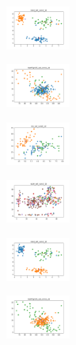 \begin{figure}[H]
\begin{subfigure}
        \centering
        \includegraphics[width=0.234\textwidth]{img/bl/rand_set_const_10_277451237_clust.png}
    \end{subfigure}
    \hfill
    \begin{subfigure}
        \centering
        \includegraphics[width=0.234\textwidth]{img/bl/newthyroid_set_const_10_277451237_clust.png}
    \end{subfigure}
    \hfill
    \begin{subfigure}
        \centering
        \includegraphics[width=0.234\textwidth]{img/bl/iris_set_const_10_49258669_clust.png}
    \end{subfigure}
    \hfill
    \begin{subfigure}
        \centering
        \includegraphics[width=0.234\textwidth]{img/bl/ecoli_set_const_10_49258669_clust.png}
    \end{subfigure}
    \hfill
    \begin{subfigure}
        \centering
        \includegraphics[width=0.234\textwidth]{img/bl/rand_set_const_10_49258669_clust.png}
    \end{subfigure}
    \hfill
    \begin{subfigure}
        \centering
        \includegraphics[width=0.234\textwidth]{img/bl/newthyroid_set_const_10_49258669_clust.png}

\end{subfigure}
\end{figure}

